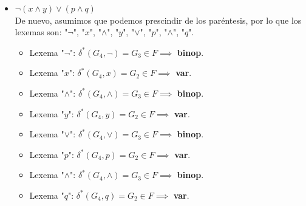 \documentclass[12pt, letterpaper]{article}
\begin{document}
\begin{enumerate}
\begin{itemize}
    \item $\neg(x \wedge y) \vee (p \wedge q)$\\ 
      De nuevo, asumimos que podemos prescindir de los paréntesis, por lo que los lexemas son: "$\neg$", "$x$", "$\wedge$", "$y$", "$\vee$", "$p$", "$\wedge$", "$q$".
      \begin{itemize}
      \item Lexema "$\neg$": $\delta^*(G_4, \neg) = G_3 \in F \implies$ \textbf{binop}.
      \item Lexema "$x$": $\delta^*(G_4, x) = G_2 \in F \implies$ \textbf{var}.
      \item Lexema "$\wedge$": $\delta^*(G_4, \wedge) = G_3 \in F \implies$ \textbf{binop}.
      \item Lexema "$y$": $\delta^*(G_4, y) = G_2 \in F \implies$ \textbf{var}.
      \item Lexema "$\vee$": $\delta^*(G_4, \vee) = G_3 \in F \implies$ \textbf{binop}.
      \item Lexema "$p$": $\delta^*(G_4, p) = G_2 \in F \implies$ \textbf{var}.
      \item Lexema "$\wedge$": $\delta^*(G_4, \wedge) = G_3 \in F \implies$ \textbf{binop}.
      \item Lexema "$q$": $\delta^*(G_4, q) = G_2 \in F \implies$ \textbf{var}.
      \end{itemize}
    \end{itemize}
\end{enumerate}
\end{document}

